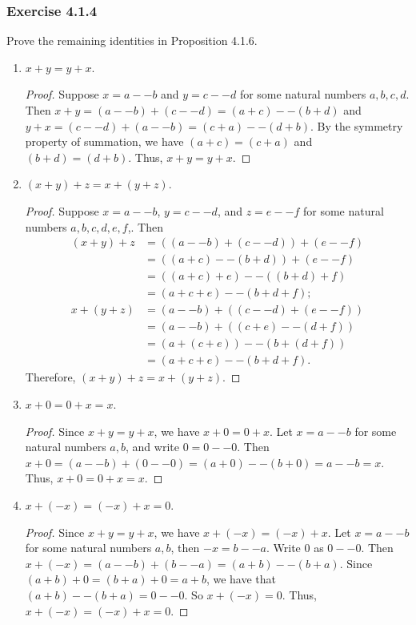 \documentclass[12pt, letter]{article}
\begin{document}
\subsubsection*{Exercise 4.1.4}
Prove the remaining identities in Proposition 4.1.6.
\begin{enumerate}
    \item $x+y=y+x$.
    \begin{proof}
        Suppose $x=a--b$ and $y=c--d$ for some natural numbers $a,b,c,d$. Then $x+y=(a--b)+(c--d)=(a+c)--(b+d)$ and $y+x=(c--d)+(a--b)=(c+a)--(d+b)$. By the symmetry property of summation,
        we have $(a+c)=(c+a)$ and $(b+d)=(d+b)$. Thus, $x+y=y+x$.
    \end{proof}
    \item $(x+y)+z=x+(y+z)$.
    \begin{proof}
        Suppose $x=a--b$, $y=c--d$, and $z=e--f$ for some natural numbers $a,b,c,d,e,f$,. Then 
        \begin{equation*}
            \begin{aligned}
                (x+y)+z&=((a--b)+(c--d))+(e--f)\\
                &=((a+c)--(b+d))+(e--f)\\
                &=((a+c)+e)--((b+d)+f)\\
                &=(a+c+e)--(b+d+f);\\
                x+(y+z)&=(a--b)+((c--d)+(e--f))\\
                &=(a--b)+((c+e)--(d+f))\\
                &=(a+(c+e))--(b+(d+f))\\
                &=(a+c+e)--(b+d+f).
            \end{aligned}
        \end{equation*}
        Therefore, $(x+y)+z=x+(y+z)$.
    \end{proof}
    \item $x+0=0+x=x$.
    \begin{proof}
        Since $x+y=y+x$, we have $x+0=0+x$. Let $x=a--b$ for some natural numbers $a,b$, and write $0=0--0$. Then $x+0=(a--b)+(0--0)=(a+0)--(b+0)=a--b=x$. 
        Thus, $x+0=0+x=x$.
    \end{proof}
    \item $x+(-x)=(-x)+x=0$.
    \begin{proof}
        Since $x+y=y+x$, we have $x+(-x)=(-x)+x$. Let $x=a--b$ for some natural numbers $a,b$, then $-x=b--a$. Write $0$ as $0--0$. 
        Then $x+(-x)=(a--b)+(b--a)=(a+b)--(b+a)$. Since $(a+b)+0=(b+a)+0=a+b$, we have that $(a+b)--(b+a)=0--0$. So $x+(-x)=0$. Thus, $x+(-x)=(-x)+x=0$.

\end{proof}
\end{enumerate}
\end{document}
